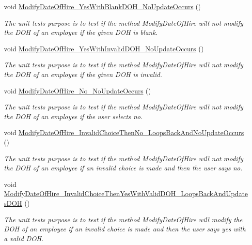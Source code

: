 \begin{DoxyCompactItemize}
void \hyperlink{class_the_company_1_1_tests_1_1_modify_employee_tests_ab8db3163961d79a544dbc4b6b1495953}{Modify\+Date\+Of\+Hire\+\_\+\+Yes\+With\+Blank\+D\+O\+H\+\_\+\+No\+Update\+Occurs} ()
\begin{DoxyCompactList}\small\item\em The unit test\textquotesingle{}s purpose is to test if the method Modify\+Date\+Of\+Hire will not modify the D\+O\+H of an employee if the given D\+O\+H is blank. \end{DoxyCompactList}\item 
void \hyperlink{class_the_company_1_1_tests_1_1_modify_employee_tests_ad529f19fa1f549957a92e767cffb3e33}{Modify\+Date\+Of\+Hire\+\_\+\+Yes\+With\+Invalid\+D\+O\+H\+\_\+\+No\+Update\+Occurs} ()
\begin{DoxyCompactList}\small\item\em The unit test\textquotesingle{}s purpose is to test if the method Modify\+Date\+Of\+Hire will not modify the D\+O\+H of an employee if the given D\+O\+H is invalid. \end{DoxyCompactList}\item 
void \hyperlink{class_the_company_1_1_tests_1_1_modify_employee_tests_ab9734d94d98d65ec9f0e689718dcdc92}{Modify\+Date\+Of\+Hire\+\_\+\+No\+\_\+\+No\+Update\+Occurs} ()
\begin{DoxyCompactList}\small\item\em The unit test\textquotesingle{}s purpose is to test if the method Modify\+Date\+Of\+Hire will not modify the D\+O\+H of an employee if the user selects no. \end{DoxyCompactList}\item 
void \hyperlink{class_the_company_1_1_tests_1_1_modify_employee_tests_acb3919a664f9340a3de0c9ed76102889}{Modify\+Date\+Of\+Hire\+\_\+\+Invalid\+Choice\+Then\+No\+\_\+\+Loops\+Back\+And\+No\+Update\+Occurs} ()
\begin{DoxyCompactList}\small\item\em The unit test\textquotesingle{}s purpose is to test if the method Modify\+Date\+Of\+Hire will not modify the D\+O\+H of an employee if an invalid choice is made and then the user says no. \end{DoxyCompactList}\item 
void \hyperlink{class_the_company_1_1_tests_1_1_modify_employee_tests_a78cf4ce160fed92716f9568872ab4924}{Modify\+Date\+Of\+Hire\+\_\+\+Invalid\+Choice\+Then\+Yes\+With\+Valid\+D\+O\+H\+\_\+\+Loops\+Back\+And\+Updates\+D\+O\+H} ()
\begin{DoxyCompactList}\small\item\em The unit test\textquotesingle{}s purpose is to test if the method Modify\+Date\+Of\+Hire will modify the D\+O\+H of an employee if an invalid choice is made and then the user says yes with a valid D\+O\+H. \end{DoxyCompactList}\item 

\end{DoxyCompactItemize}

